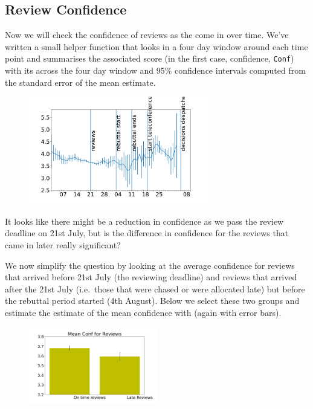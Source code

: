 \hypertarget{review-confidence}{%
\subsection{Review Confidence}\label{review-confidence}}

Now we will check the confidence of reviews as the come in over time.
We've written a small helper function that looks in a four day window
around each time point and summarises the associated score (in the first
case, confidence, \texttt{Conf}) with its across the four day window and
95\% confidence intervals computed from the standard error of the mean
estimate.

\begin{figure}[htb]
\includegraphics[width=0.70\textwidth]{diagrams/neurips/review-confidence-time.pdf}


\caption{}
\label{review-confidence-time}
\end{figure}

It looks like there might be a reduction in confidence as we pass the
review deadline on 21st July, but is the difference in confidence for
the reviews that came in later really significant?

We now simplify the question by looking at the average confidence for
reviews that arrived before 21st July (the reviewing deadline) and
reviews that arrived after the 21st July (i.e.~those that were chased or
were allocated late) but before the rebuttal period started (4th
August). Below we select these two groups and estimate the estimate of
the mean confidence with (again with error bars).

\begin{figure}[htb]
\includegraphics[width=0.50\textwidth]{diagrams/neurips/review-confidence-early-late.pdf}


\caption{}
\label{review-confidence-early-late}
\end{figure}

